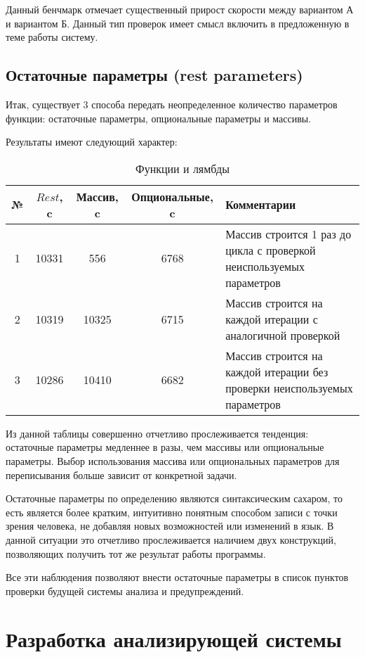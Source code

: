 \documentclass{mipt-thesis-bs}
\begin{document}
Данный бенчмарк отмечает существенный прирост скорости между вариантом 
А и вариантом Б. Данный тип проверок имеет смысл включить
в предложенную в теме работы систему.

\subsection{Остаточные параметры (rest parameters)}

Итак, существует 3 способа передать неопределенное количество параметров функции:
остаточные параметры, опциональные параметры и массивы.

Результаты имеют следующий характер:

\begin{table}[h]
    \centering
    \begin{tabularx}{\textwidth}{|c|c|c|c|X|}
      \hline
      № & $Rest$, c & Массив, c & Опциональные, c & Комментарии \\
      \hline
      1 & 10331 & 556 & 6768 & Массив строится 1 раз до цикла с проверкой неиспользуемых параметров \\
      \hline
      2 & 10319 & 10325 & 6715 & Массив строится на каждой итерации с аналогичной проверкой\\
      \hline
      3 & 10286 & 10410 & 6682 & Массив строится на каждой итерации без проверки неиспользуемых параметров\\
      \hline
    \end{tabularx}
    \caption{Функции и лямбды}
  \end{table}



Из данной таблицы совершенно отчетливо прослеживается тенденция:
остаточные параметры медленнее в разы, чем массивы или опциональные параметры.
Выбор использования массива или опциональных параметров для переписывания больше
зависит от конкретной задачи.

Остаточные параметры по определению являются синтаксическим сахаром, то есть является
более кратким, интуитивно понятным способом записи с точки зрения человека, не добавляя
новых возможностей или изменений в язык. В данной ситуации это отчетливо прослеживается
наличием двух конструкций, позволяющих получить тот же результат работы программы.

Все эти наблюдения позволяют внести остаточные параметры в список пунктов проверки
будущей системы анализа и предупреждений.

\section{Разработка анализирующей системы}
\end{document}
